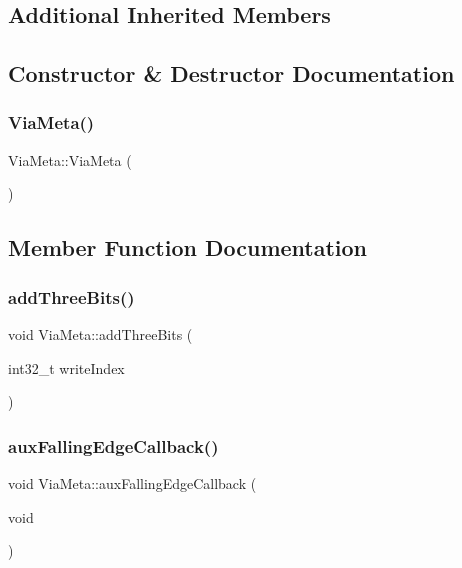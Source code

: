 \subsection*{Additional Inherited Members}


\subsection{Constructor \& Destructor Documentation}
\mbox{\label{class_via_meta_af8d8701d58f2db0e2269594d15690290}} 
\subsubsection{\texorpdfstring{Via\+Meta()}{ViaMeta()}}
{\footnotesize\ttfamily Via\+Meta\+::\+Via\+Meta (\begin{DoxyParamCaption}{ }\end{DoxyParamCaption})\hspace{0.3cm}{\ttfamily [inline]}}



\subsection{Member Function Documentation}
\mbox{\label{class_via_meta_a3d97e2435f744b283f1f844ad88cb74d}} 
\subsubsection{\texorpdfstring{add\+Three\+Bits()}{addThreeBits()}}
{\footnotesize\ttfamily void Via\+Meta\+::add\+Three\+Bits (\begin{DoxyParamCaption}\item[{int32\+\_\+t}]{write\+Index }\end{DoxyParamCaption})}

\mbox{\label{class_via_meta_ae3ee604199052c98b3686b05415080f1}} 
\subsubsection{\texorpdfstring{aux\+Falling\+Edge\+Callback()}{auxFallingEdgeCallback()}}
{\footnotesize\ttfamily void Via\+Meta\+::aux\+Falling\+Edge\+Callback (\begin{DoxyParamCaption}\item[{void}]{ }\end{DoxyParamCaption})}

